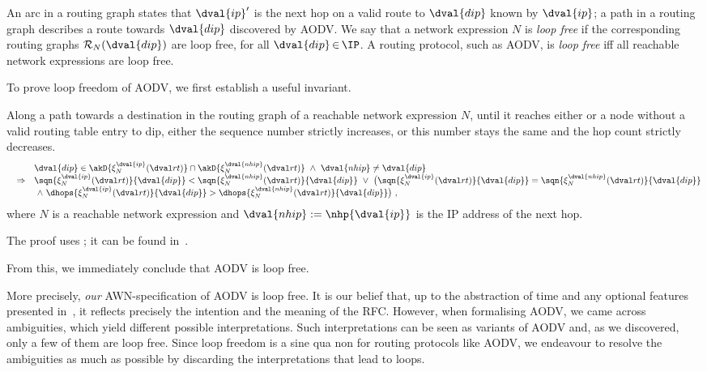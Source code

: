 \documentclass[envcountsame,envcountsect,orivec,runningheads]{llncs}
\newcommand{\awn}{AWN\xspace}
\newcommand{\ans}{\spaces{\wedge}}
\newcommand{\ors}{\spaces{\vee}}
\begin{document}
An arc in a routing graph states that $\dval{ip}'$ is the next hop on
a valid route to $\dval{dip}$ known by $\dval{ip}$; a path in a routing
graph describes a route towards $\dval{dip}$ discovered by AODV\@.
We say that a network expression $N$ is \emph{loop free} if the
corresponding routing graphs $\RG{N}{\dval{dip}}$ are loop free, for
all $\dval{dip}\mathop{\in}\IP$. A routing protocol, such as AODV, is
\emph{loop free} iff all reachable network expressions are loop free.

To prove loop freedom of AODV, we first establish a useful invariant.
\begin{theorem}\rm\label{thm:loop free}
Along a path towards a destination  in the routing
graph of a reachable network expression $N$, until it reaches either
 or a node without a valid routing table entry to dip,
either the sequence number strictly increases, or 
this number stays the same and the hop count strictly decreases.
{\small
\begin{equation*}
\begin{array}{@{}rcl@{}}
&&\dval{dip}\in\akD{\xiN{\dval{ip}}(\rt)}\cap \akD{\xiN{\dval{nhip}}(\rt)}\ans\dval{nhip}\not=\dval{dip}\\
&\Rightarrow& 
\sqn{\xiN{\dval{ip}}(\rt)}{\dval{dip}} < \sqn{\xiN{\dval{nhip}}(\rt)}{\dval{dip}} \ors
\big(\sqn{\xiN{\dval{ip}}(\rt)}{\dval{dip}} = \sqn{\xiN{\dval{nhip}}(\rt)}{\dval{dip}}\\
&& \ans
\dhops{\xiN{\dval{ip}}(\rt)}{\dval{dip}} > \dhops{\xiN{\dval{nhip}}(\rt)}{\dval{dip}}\big)
\ ,
\end{array}
\end{equation*}}where $N$ is a reachable network expression and $\dval{nhip}:=\nhp{\dval{ip}}$ is the IP address of the next hop.
\end{theorem}
\noindent
The proof uses ; it can be found in~\cite{TR11}.

From this, we immediately conclude that AODV is loop free.

More precisely, {\em our} \awn-specification of AODV 
is loop free. 
It is our belief that, up to the abstraction of time and any optional features presented in~\cite{rfc3561}, 
it reflects precisely the intention and the meaning of the RFC\@. 
However, when formalising AODV, we came across ambiguities, which yield different possible interpretations.
Such interpretations can be seen as variants of AODV and, as we discovered, only a few of them are loop free. 
Since loop freedom is a sine qua non for routing protocols like
  AODV, we endeavour to resolve the ambiguities as much as possible by
  discarding the interpretations that lead to loops.
\end{document}
